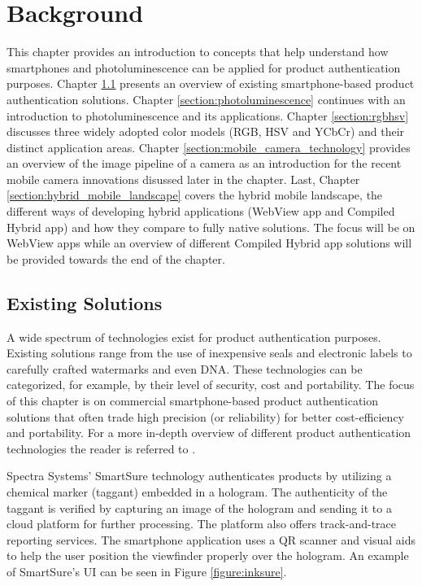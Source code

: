 \documentclass[thesis.tex]{subfiles}
\begin{document}
\chapter{Background}
\label{chapter:background}

This chapter provides an introduction to concepts that help understand how smartphones and photoluminescence can be applied for product authentication purposes. Chapter \ref{section:existing_solutions} presents an overview of existing smartphone-based product authentication solutions. Chapter \ref{section:photoluminescence} continues with an introduction to photoluminescence and its applications. Chapter \ref{section:rgbhsv} discusses three widely adopted color models (RGB, HSV and YCbCr) and their distinct application areas. Chapter \ref{section:mobile_camera_technology} provides an overview of the image pipeline of a camera as an introduction for the recent mobile camera innovations disussed later in the chapter. Last, Chapter \ref{section:hybrid_mobile_landscape} covers the hybrid mobile landscape, the different ways of developing hybrid applications (WebView app and Compiled Hybrid app) and how they compare to fully native solutions. The focus will be on WebView apps while an overview of different Compiled Hybrid app solutions will be provided towards the end of the chapter.


\section{Existing Solutions}
\label{section:existing_solutions}

A wide spectrum of technologies exist for product authentication purposes. Existing solutions range from the use of inexpensive seals and electronic labels to carefully crafted watermarks and even DNA. These technologies can be categorized, for example, by their level of security, cost and portability. The focus of this chapter is on commercial smartphone-based product authentication solutions that often trade high precision (or reliability) for better cost-efficiency and portability. For a more in-depth overview of different product authentication technologies the reader is referred to \cite{kuosmanen}.

Spectra Systems' SmartSure technology authenticates products by utilizing a chemical marker (taggant) embedded in a hologram. The authenticity of the taggant is verified by capturing an image of the hologram and sending it to a cloud platform for further processing. The platform also offers track-and-trace reporting services. The smartphone application uses a QR scanner and visual aids to help the user position the viewfinder properly over the hologram. \cite{inksure} An example of SmartSure's UI can be seen in Figure \ref{figure:inksure}.
\end{document}
